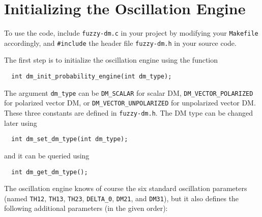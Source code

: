 \documentclass{scrartcl}
\begin{document}
\section{Initializing the Oscillation Engine}

To use the code, include {\tt fuzzy-dm.c} in your project by modifying your
{\tt Makefile} accordingly, and {\tt \#include} the header file {\tt fuzzy-dm.h}
in your source code.

The first step is to initialize the oscillation engine using the function
\begin{verbatim}
  int dm_init_probability_engine(int dm_type);
\end{verbatim}
The argument {\tt dm_type} can be {\tt DM_SCALAR} for scalar DM,
{\tt DM_VECTOR_POLARIZED} for polarized vector DM, or
{\tt DM_VECTOR_UNPOLARIZED} for unpolarized vector DM.  These three
constants are defined in {\tt fuzzy-dm.h}.  The DM type can be
changed later using
\begin{verbatim}
  int dm_set_dm_type(int dm_type);
\end{verbatim}
and it can be queried using
\begin{verbatim}
  int dm_get_dm_type();
\end{verbatim}

The oscillation engine knows of course the six standard oscillation parameters
(named {\tt TH12}, {\tt TH13}, {\tt TH23}, {\tt DELTA_0}, {\tt DM21}, and
{\tt DM31}), but it also defines the following additional parameters
(in the given order):
\end{document}
